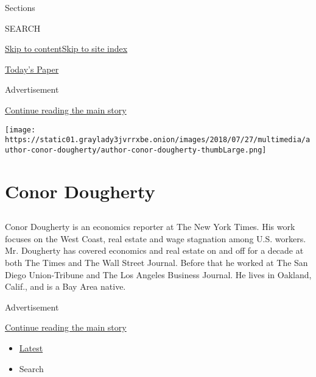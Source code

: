 Sections

SEARCH

\protect\hyperlink{site-content}{Skip to
content}\protect\hyperlink{site-index}{Skip to site index}

\href{https://myaccount.nytimes3xbfgragh.onion/auth/login?response_type=cookie\&client_id=vi}{}

\href{https://www.nytimes3xbfgragh.onion/section/todayspaper}{Today's
Paper}

Advertisement

\protect\hyperlink{after-top}{Continue reading the main story}

\texttt{[image: https://static01.graylady3jvrrxbe.onion/images/2018/07/27/multimedia/author-conor-dougherty/author-conor-dougherty-thumbLarge.png]}

\hypertarget{conor-dougherty}{%
\section{Conor Dougherty}\label{conor-dougherty}}

\subsection{}

Conor Dougherty is an economics reporter at The New York Times. His work
focuses on the West Coast, real estate and wage stagnation among U.S.
workers. Mr. Dougherty has covered economics and real estate on and off
for a decade at both The Times and The Wall Street Journal. Before that
he worked at The San Diego Union-Tribune and The Los Angeles Business
Journal. He lives in Oakland, Calif., and is a Bay Area native.

Advertisement

\protect\hyperlink{after-mid1}{Continue reading the main story}

\begin{itemize}
\tightlist
\item
  \protect\hyperlink{stream-panel}{Latest}
\item
  Search
\end{itemize}

